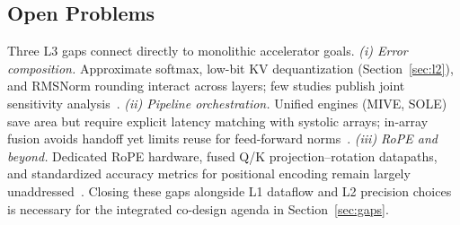 \documentclass[conference]{IEEEtran}
\begin{document}
\begin{table}[t]
\caption{Representative non-GEMM hardware (L3).
PWL = piecewise linear; int.\ = in-array integration.}
\label{tab:l3}
\centering
\scriptsize
\setlength{\tabcolsep}{2pt}
\renewcommand{\arraystretch}{1.05}
\end{table}

\subsection{Open Problems}
\label{sec:l3-open}

Three L3 gaps connect directly to monolithic accelerator goals.
\emph{(i) Error composition.} Approximate softmax, low-bit KV dequantization (Section~\ref{sec:l2}), and RMSNorm rounding interact across layers; few studies publish joint sensitivity analysis~\cite{guaranteednorm2026,sole2025,liu2024kivi}.
\emph{(ii) Pipeline orchestration.} Unified engines (MIVE, SOLE) save area but require explicit latency matching with systolic arrays; in-array fusion avoids handoff yet limits reuse for feed-forward norms~\cite{mive2026,lin2025systolicattention,desa2025}.
\emph{(iii) RoPE and beyond.} Dedicated RoPE hardware, fused Q/K projection--rotation datapaths, and standardized accuracy metrics for positional encoding remain largely unaddressed~\cite{su2024roformer,plena2025}.
Closing these gaps alongside L1 dataflow and L2 precision choices is necessary for the integrated co-design agenda in Section~\ref{sec:gaps}.
\end{document}
